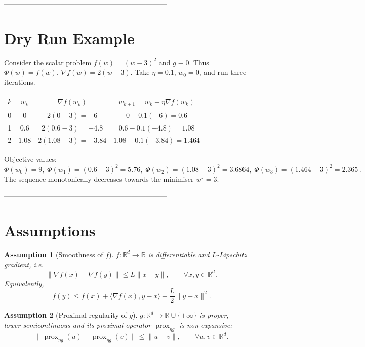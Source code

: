 \documentclass{article}
\newtheorem{assumption}{Assumption}
\begin{document}
---------------------------------------------------------------------

\section*{Dry Run Example}
Consider the scalar problem $f(w)=(w-3)^2$ and $g\equiv0$.  
Thus $\Phi(w)=f(w)$, $\nabla f(w)=2(w-3)$.  
Take $\eta=0.1$, $w_0=0$, and run three iterations.

\begin{center}
\begin{tabular}{c|c|c|c}
$k$ & $w_k$ & $\nabla f(w_k)$ & $w_{k+1}=w_k-\eta\nabla f(w_k)$\\\hline
0 & $0$ & $2(0-3)=-6$ & $0-0.1(-6)=0.6$\\
1 & $0.6$ & $2(0.6-3)=-4.8$ & $0.6-0.1(-4.8)=1.08$\\
2 & $1.08$ & $2(1.08-3)=-3.84$ & $1.08-0.1(-3.84)=1.464$\\
\end{tabular}
\end{center}
Objective values:
\[
\Phi(w_0)=9,\;\Phi(w_1)=(0.6-3)^2=5.76,\;
\Phi(w_2)=(1.08-3)^2=3.6864,\;
\Phi(w_3)=(1.464-3)^2=2.365\,.
\]
The sequence monotonically decreases towards the minimiser $w^\star=3$.

---------------------------------------------------------------------

\section*{Assumptions}
\begin{assumption}[Smoothness of $f$]\label{ass:smooth}
$f:\mathbb{R}^d\to\mathbb{R}$ is differentiable and $L$‑Lipschitz gradient, i.e.
\[
\|\nabla f(x)-\nabla f(y)\|\le L\|x-y\|,\qquad\forall x,y\in\mathbb{R}^d .
\tag{5}
\]
Equivalently,
\[
f(y)\le f(x)+\langle\nabla f(x),y-x\rangle+\frac{L}{2}\|y-x\|^2 .
\tag{6}
\]
\end{assumption}

\begin{assumption}[Proximal regularity of $g$]\label{ass:prox}
$g:\mathbb{R}^d\to\mathbb{R}\cup\{+\infty\}$ is proper, lower‑semicontinuous and its proximal operator $\operatorname{prox}_{\eta g}$ is \emph{non‑expansive}:
\[
\bigl\|\operatorname{prox}_{\eta g}(u)-\operatorname{prox}_{\eta g}(v)\bigr\|
\le\|u-v\|,\qquad\forall u,v\in\mathbb{R}^d .
\tag{7}
\]
\end{assumption}
\end{document}
